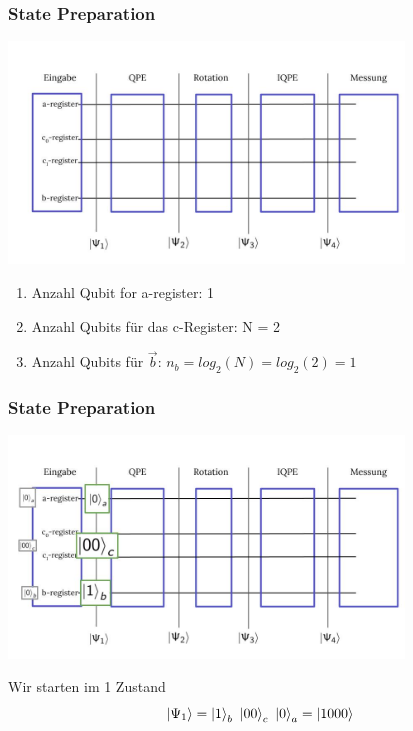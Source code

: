 \begin{frame}
    \frametitle{State Preparation}

    \begin{center}
    \includegraphics[width=10.5cm]{img/example_circuit/example_circuit.jpg}
    \end{center}

    \begin{enumerate}
        \item Anzahl Qubit for a-register: 1
        \item Anzahl Qubits für das c-Register: N = 2
        \item Anzahl Qubits für $\vec{b}$: $n_b = log_2(N) = log_2 (2) = 1$ 
    \end{enumerate}
\end{frame}


\begin{frame}
    \frametitle{State Preparation}

    \begin{center}
    \includegraphics[width=10.5cm]{img/example_circuit/example_circuit_1.jpg}
    \end{center}

    Wir starten im 1 Zustand
    $$\ket{\Psi_1} = \ket{1}_b\ \ket{00}_c\ \ket{0}_a = \ket{1000}$$

\end{frame}


